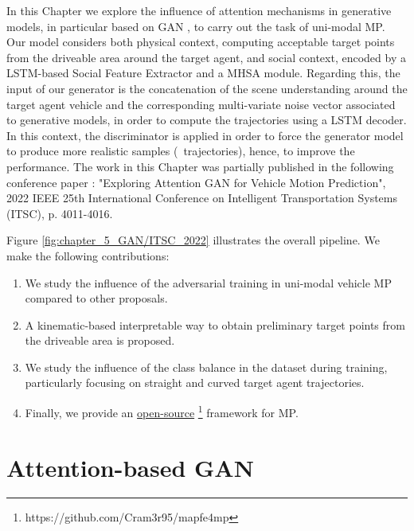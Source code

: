 In this Chapter we explore the influence of attention mechanisms in generative models, in particular based on \ac{GAN} \cite{goodfellow2020generative}, to carry out the task of uni-modal \ac{MP}. Our model considers both physical context, computing acceptable target points from the driveable area around the target agent, and social context, encoded by a \ac{LSTM}-based Social Feature Extractor and a \acf{MHSA} module. Regarding this, the input of our generator is the concatenation of the scene understanding around the target agent vehicle and the corresponding multi-variate noise vector associated to generative models, in order to compute the trajectories using a \ac{LSTM} decoder. In this context, the discriminator is applied in order to force the generator model to produce more realistic samples (\ie \ trajectories), hence, to improve the performance. The work in this Chapter was partially published in the following conference paper \cite{gomez2022exploring}: "Exploring Attention GAN for Vehicle Motion Prediction", 2022 IEEE 25th International Conference on Intelligent Transportation Systems (ITSC), p. 4011-4016. 

Figure \ref{fig:chapter_5_GAN/ITSC_2022} illustrates the overall pipeline. We make the following contributions:

\begin{enumerate}
	
	\item We study the influence of the adversarial training in uni-modal vehicle \ac{MP} compared to other proposals. 
	
	\item A kinematic-based interpretable way to obtain preliminary target points from the driveable area is proposed.
	\item We study the influence of the class balance in the dataset during training, particularly focusing on straight and curved target agent trajectories.
	
	\item Finally, we provide an \href{https://github.com/Cram3r95/mapfe4mp}{open-source} \footnote{https://github.com/Cram3r95/mapfe4mp} framework for \ac{MP}.
	
\end{enumerate}

\section{Attention-based GAN}
\label{sec:5_attention_gan}

